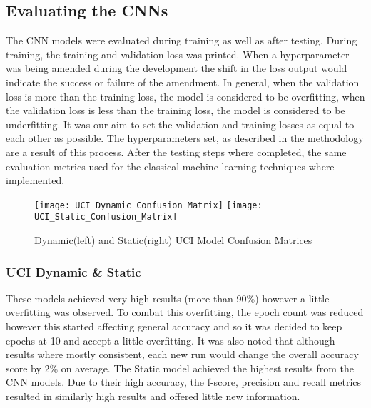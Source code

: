 \subsection{Evaluating the CNNs}
The CNN models were evaluated during training as well as after testing.
During training, the training and validation loss was printed.
When a hyperparameter was being amended during the development the shift in the loss output would indicate the success or failure of the amendment.
In general, when the validation loss is more than the training loss, the model is considered to be overfitting, when the validation loss is less than the training loss, the model is considered to be underfitting.
It was our aim to set the validation and training losses as equal to each other as possible.
The hyperparameters set, as described in the methodology are a result of this process.
After the testing steps where completed, the same evaluation metrics used for the classical machine learning techniques where implemented.

\begin{figure}[h]
\centering
\texttt{[image: UCI\_Dynamic\_Confusion\_Matrix]}\hfill
\texttt{[image: UCI\_Static\_Confusion\_Matrix]}\hfill
\caption{Dynamic(left) and Static(right) UCI Model Confusion Matrices}
\label{fig:UCI_Confusions}
\end{figure}

\subsubsection{UCI Dynamic \& Static}
These models achieved very high results (more than 90\%) however a little overfitting was observed.
To combat this overfitting, the epoch count was reduced however this started affecting general accuracy and so it was decided to keep epochs at 10 and accept a little overfitting.
It was also noted that although results where mostly consistent, each new run would change the overall accuracy score by 2\% on average.
The Static model achieved the highest results from the CNN models.
Due to their high accuracy, the f-score, precision and recall metrics resulted in similarly high results and offered little new information.


